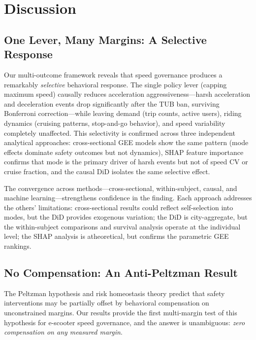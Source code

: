 \section{Discussion}
\label{sec:discussion}

\subsection{One Lever, Many Margins: A Selective Response}
\label{sec:disc_selective}

Our multi-outcome framework reveals that speed governance produces a remarkably \textit{selective} behavioral response. The single policy lever (capping maximum speed) causally reduces acceleration aggressiveness---harsh acceleration and deceleration events drop significantly after the TUB ban, surviving Bonferroni correction---while leaving demand (trip counts, active users), riding dynamics (cruising patterns, stop-and-go behavior), and speed variability completely unaffected. This selectivity is confirmed across three independent analytical approaches: cross-sectional GEE models show the same pattern (mode effects dominate safety outcomes but not dynamics), SHAP feature importance confirms that mode is the primary driver of harsh events but not of speed CV or cruise fraction, and the causal DiD isolates the same selective effect.

The convergence across methods---cross-sectional, within-subject, causal, and machine learning---strengthens confidence in the finding. Each approach addresses the others' limitations: cross-sectional results could reflect self-selection into modes, but the DiD provides exogenous variation; the DiD is city-aggregate, but the within-subject comparisons and survival analysis operate at the individual level; the SHAP analysis is atheoretical, but confirms the parametric GEE rankings.

\subsection{No Compensation: An Anti-Peltzman Result}
\label{sec:disc_peltzman}

The Peltzman hypothesis \citep{peltzman1975effects} and risk homeostasis theory \citep{wilde1982theory} predict that safety interventions may be partially offset by behavioral compensation on unconstrained margins. Our results provide the first multi-margin test of this hypothesis for e-scooter speed governance, and the answer is unambiguous: \textit{zero compensation on any measured margin}.

